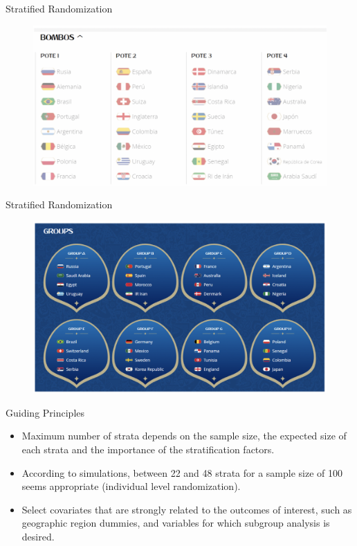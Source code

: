 \documentclass[aspectratio=169]{beamer}
\begin{document}
\begin{frame}{Stratified Randomization}

\begin{figure}
	\centering
	\includegraphics[width=\linewidth]{img/Clusters2}
\end{figure}

\end{frame}


\begin{frame}{Stratified Randomization}

\begin{figure}
	\centering
	\includegraphics[width=\linewidth]{img/Clusters3}
\end{figure}

\end{frame}


\begin{frame}{Guiding Principles }

\begin{itemize}[<default overlay specification>]
	\item<1>  Maximum number of strata depends on the sample size, the expected size of each strata and the importance of the stratification factors.
	\item<1>  According to simulations, between 22 and 48 strata for a sample size of 100 seems appropriate (individual level randomization). 
	\item<1>  Select covariates that are strongly related to the outcomes of interest, such as geographic region dummies, and variables for which subgroup analysis is desired.
\end{itemize}

\end{frame}
\end{document}
